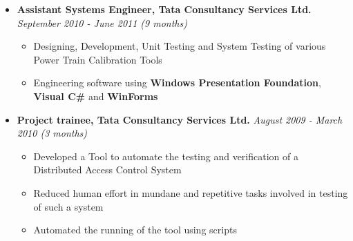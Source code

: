 \begin{itemize}
	\item \textbf{Assistant Systems Engineer, Tata Consultancy Services Ltd.} \hfill \emph{September 2010 - June 2011 (9 months)} \\[-0.6cm]
		\begin{itemize}
			\item Designing, Development, Unit Testing and System Testing of various Power Train Calibration Tools \\[-0.5cm]
			\item Engineering software using \textbf{Windows Presentation Foundation}, \textbf{Visual C\#} and \textbf{WinForms} \\[-0.6cm]
		\end{itemize}
	\item \textbf{Project trainee, Tata Consultancy Services Ltd.} \hfill \emph{August 2009 - March 2010 (3 months)} \\[-0.6cm]
		\begin{itemize}
			\item Developed a Tool to automate the testing and verification of a Distributed Access Control System \\[-0.5cm]
			\item Reduced human effort in mundane and repetitive tasks involved in testing of such a system \\[-0.5cm]
			\item Automated the running of the tool using scripts
		\end{itemize}
\end{itemize}